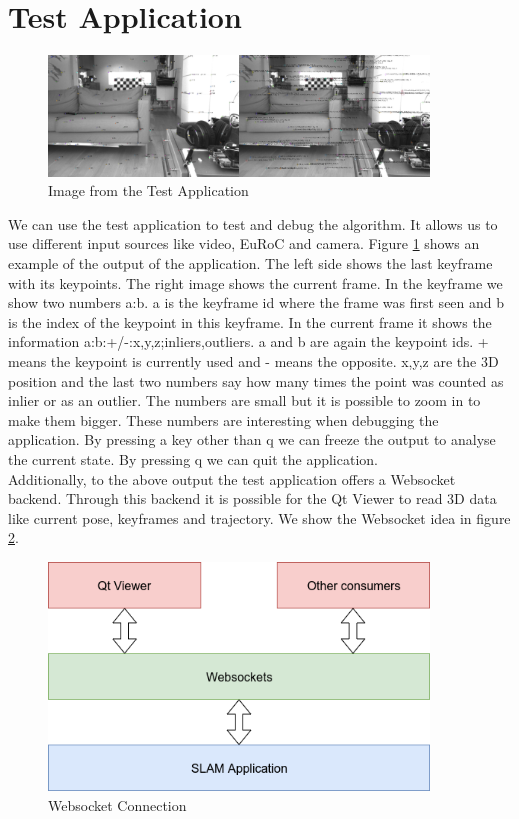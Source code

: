 \documentclass[11pt,a4paper,titlepage,oneside]{report}
\begin{document}
\section{Test Application}

\begin{figure}[H]
  \centering
  \includegraphics[width=0.9\textwidth]{img/test_app.png}
  \caption{Image from the Test Application}\label{fig:test_app}
\end{figure}

We can use the test application to test and debug the algorithm. It allows us to use different input sources like video, EuRoC and camera. Figure \ref{fig:test_app} shows an example of the output of the application. The left side shows the last keyframe with its keypoints. The right image shows the current frame. In the keyframe we show two numbers a:b. a is the keyframe id where the frame was first seen and b is the index of the keypoint in this keyframe. In the current frame it shows the information a:b:+/-:x,y,z;inliers,outliers. a and b are again the keypoint ids. + means the keypoint is currently used and - means the opposite. x,y,z are the 3D position and the last two numbers say how many times the point was counted as inlier or as an outlier. The numbers are small but it is possible to zoom in to make them bigger. These numbers are interesting when debugging the application. By pressing a key other than q we can freeze the output to analyse the current state. By pressing q we can quit the application.\\
Additionally, to the above output the test application offers a Websocket \cite{websocket} backend. Through this backend it is possible for the Qt Viewer to read 3D data like current pose, keyframes and trajectory. We show the Websocket idea in figure \ref{fig:websocket}.

\begin{figure}[H]
  \centering
  \includegraphics[width=0.9\textwidth]{img/websocket.png}
  \caption{Websocket Connection}\label{fig:websocket}
\end{figure}
\end{document}
